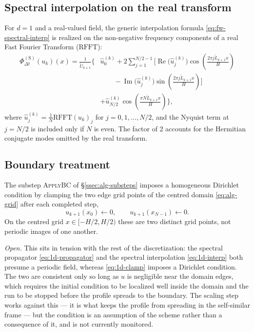 \subsection{Spectral interpolation on the real transform}\label{ssec:1d-interpolation}

For $d = 1$ and a real-valued field, the generic interpolation formula
\eqref{eq:fw-spectral-interp} is realized on the non-negative frequency
components of a real Fast Fourier Transform ($\mathrm{RFFT}$):
\begin{equation}\label{eq:1d-interp}
  \begin{split}
    \Phi_{\Delta t}^{(\mathrm{S})}(u_k)(x) = \frac{1}{\tilde{U}_{k+1}}\biggl\{ &\hat{u}_0^{(k)}
      + 2 \sum_{j=1}^{N/2-1} \biggl[ \operatorname{Re}\bigl(\hat{u}_j^{(k)}\bigr) \cos\left(\frac{2\pi j \tilde{L}_{k+1} x}{H}\right) \\
      &\qquad - \operatorname{Im}\bigl(\hat{u}_j^{(k)}\bigr) \sin\left(\frac{2\pi j \tilde{L}_{k+1} x}{H}\right) \biggr] \\
      &+ \hat{u}_{N/2}^{(k)} \cos\left(\frac{\pi N \tilde{L}_{k+1} x}{H}\right) \biggr\},
  \end{split}
\end{equation}
where $\hat{u}_j^{(k)} = \frac{1}{N} \mathrm{RFFT}(u_k)_j$ for
$j = 0, 1, \dots, N/2$, and the Nyquist term at $j = N/2$ is included only if
$N$ is even. The factor of $2$ accounts for the Hermitian conjugate modes
omitted by the real transform.

\subsection{Boundary treatment}\label{ssec:1d-boundary}

The substep \textsc{ApplyBC} of \S\ref{ssec:alg-substeps} imposes a homogeneous
Dirichlet condition by clamping the two edge grid points of the centred domain
\eqref{eq:alg-grid} after each completed step,
\begin{equation}\label{eq:1d-clamp}
  u_{k+1}(x_0) \gets 0, \qquad u_{k+1}(x_{N-1}) \gets 0 .
\end{equation}
On the centred grid $x \in [-H/2, H/2)$ these are two distinct grid points, not
periodic images of one another.

\emph{Open.} This sits in tension with the rest of the discretization: the
spectral propagator \eqref{eq:1d-propagator} and the spectral interpolation
\eqref{eq:1d-interp} both presume a periodic field, whereas
\eqref{eq:1d-clamp} imposes a Dirichlet condition. The two are consistent only
so long as $u$ is negligible near the domain edges, which requires the initial
condition to be localized well inside the domain and the run to be stopped
before the profile spreads to the boundary. The scaling step works against
this --- it is what keeps the profile from spreading in the self-similar frame
--- but the condition is an assumption of the scheme rather than a consequence
of it, and is not currently monitored.
